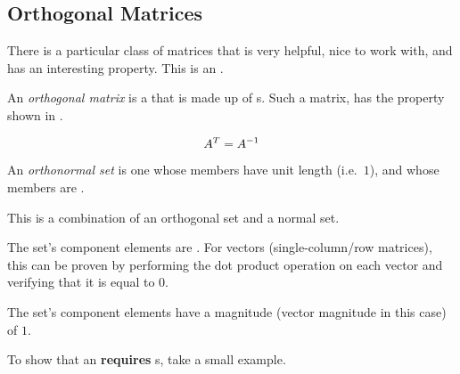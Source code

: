 \subsection{Orthogonal Matrices}\label{subsec:Orthogonal_Matrices}
There is a particular class of matrices that is very helpful, nice to work with, and has an interesting property.
This is an .

\begin{definition}\label{def:Orthogonal_Matrix}
  An \emph{orthogonal matrix} is a  that is made up of s.
  Such a matrix, has the property shown in .

  \begin{equation}\label{eq:Orthogonal_Matrix_Property}
    {A}^{T} = A^{-1}
  \end{equation}
\end{definition}

\begin{definition}\label{def:Orthonormal_Set}
  An \emph{orthonormal set} is one whose members have unit length (i.e.\ $1$), and whose members are .

  \begin{remark}
    This is a combination of an orthogonal set and a normal set.
    \begin{description}[noitemsep]
    \item[Orthogonal] The set's component elements are .
      For vectors (single-column/row matrices), this can be proven by performing the dot product operation on each vector and verifying that it is equal to 0.
    \item[Normal] The set's component elements have a magnitude (vector magnitude in this case) of $1$.
    \end{description}
  \end{remark}
\end{definition}

To show that an  \textbf{requires} s, take a small example.

